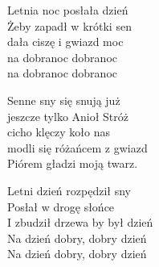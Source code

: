 \begin{text}
    Letnia noc posłała dzień\\
    Żeby zapadł w krótki sen\\
    dała ciszę i gwiazd moc\\
    na dobranoc dobranoc\\
    na dobranoc dobranoc

    Senne sny się snują już\\
    jeszcze tylko Anioł Stróż\\
    cicho klęczy koło nas\\
    modli się różańcem z gwiazd\\
    Piórem gładzi moją twarz.

    Letni dzień rozpędził sny\\
    Posłał w drogę słońce\\
    I zbudził drzewa by był dzień\\
    Na dzień dobry, dobry dzień\\
    Na dzień dobry, dobry dzień
\end{text}
\begin{chord}

\end{chord}